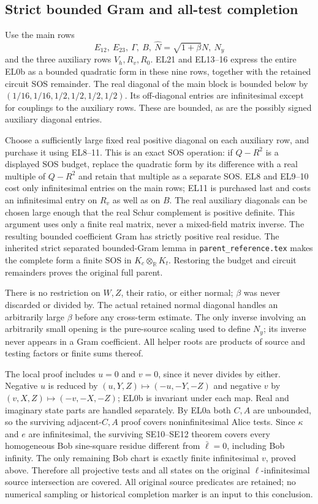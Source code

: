 \subsection{Strict bounded Gram and all-test completion}
Use the main rows
\[
 E_{12},\ E_{23},\ \Gamma,\ B,\ \widehat N=\sqrt{1+\beta}N,
 \ N_y
\]
and the three auxiliary rows $V_h,R_v,R_0$.
EL21 and EL13--16 express the entire EL0b as a bounded quadratic
form in these nine rows, together with the retained circuit SOS
remainder.  The real diagonal of the main block is bounded below
by $(1/16,1/16,1/2,1/2,1/2,1/2)$.
Its off-diagonal entries are infinitesimal except for couplings to
the auxiliary rows.  These are bounded, as are the possibly signed
auxiliary diagonal entries.

Choose a sufficiently large fixed real positive diagonal on each
auxiliary row, and purchase it using EL8--11.  This is an exact
SOS operation: if $Q-R^2$ is a displayed SOS budget, replace the
quadratic form by its difference with a real multiple of $Q-R^2$
and retain that multiple as a separate SOS.  EL8 and EL9--10 cost
only infinitesimal entries on the main rows; EL11 is purchased
last and costs an infinitesimal entry on $R_v$ as well as on $B$.
The real auxiliary diagonals can be chosen large enough that the
real Schur complement is positive definite.  This argument uses
only a finite real matrix, never a mixed-field matrix inverse.
The resulting bounded coefficient Gram has strictly positive real
residue.  The inherited strict separated bounded-Gram lemma in
\texttt{parent\_reference.tex} makes the complete form a finite
SOS in $K_c\otimes_{\mathbb R}K_t$.  Restoring the budget and circuit
remainders proves the original full parent.

There is no restriction on $W,Z$, their ratio, or either normal;
$\beta$ was never discarded or divided by.  The actual retained
normal diagonal handles an arbitrarily large $\beta$ before any
cross-term estimate.  The only inverse involving an arbitrarily
small opening is the pure-source scaling used to define $N_y$;
its inverse never appears in a Gram coefficient.  All helper roots
are products of source and testing factors or finite sums thereof.

The local proof includes $u=0$ and $v=0$, since it never divides
by either.  Negative $u$ is reduced by
$(u,Y,Z)\mapsto(-u,-Y,-Z)$ and negative $v$ by
$(v,X,Z)\mapsto(-v,-X,-Z)$; EL0b is invariant under each map.
Real and imaginary state parts are handled separately.
By EL0a both $C,A$ are unbounded, so the surviving adjacent-$C,A$
proof covers noninfinitesimal Alice tests.  Since $\kappa$ and $e$
are infinitesimal, the surviving SE10--SE12 theorem covers every
homogeneous Bob sine-square residue different from $\bar\ell=0$,
including Bob infinity.  The only remaining Bob chart is exactly
finite infinitesimal $v$, proved above.  Therefore all projective
tests and all states on the original $\ell$-infinitesimal source
intersection are covered.  All original source predicates are
retained; no numerical sampling or historical completion marker
is an input to this conclusion.
